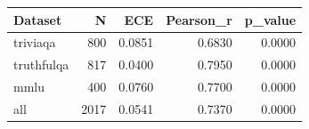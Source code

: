 \begin{tabular}{lrrrr}
\toprule
Dataset & N & ECE & Pearson\_r & p\_value \\
\midrule
triviaqa & 800 & 0.0851 & 0.6830 & 0.0000 \\
truthfulqa & 817 & 0.0400 & 0.7950 & 0.0000 \\
mmlu & 400 & 0.0760 & 0.7700 & 0.0000 \\
all & 2017 & 0.0541 & 0.7370 & 0.0000 \\
\bottomrule
\end{tabular}
